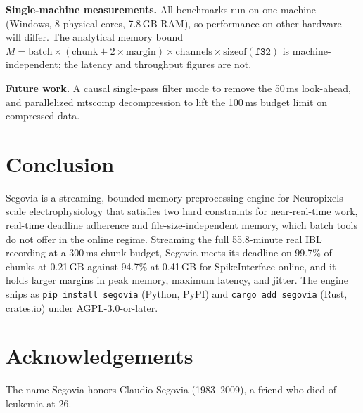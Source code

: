 \documentclass[11pt]{article}
\begin{document}
\textbf{Single-machine measurements.} All benchmarks run on one machine (Windows, 8 physical cores,
7.8\,GB RAM), so performance on other hardware will differ. The analytical memory bound
$M = \text{batch} \times (\text{chunk} + 2 \times \text{margin}) \times \text{channels} \times
\text{sizeof}(\texttt{f32})$ is machine-independent; the latency and throughput figures are not.

\textbf{Future work.} A causal single-pass filter mode to remove the 50\,ms look-ahead, and
parallelized mtscomp decompression to lift the 100\,ms budget limit on compressed data.

\section{Conclusion}

Segovia is a streaming, bounded-memory preprocessing engine for Neuropixels-scale electrophysiology
that satisfies two hard constraints for near-real-time work, real-time deadline adherence and
file-size-independent memory, which batch tools do not offer in the online regime. Streaming the full
55.8-minute real IBL recording at a 300\,ms chunk budget, Segovia meets its deadline on 99.7\% of
chunks at 0.21\,GB against 94.7\% at 0.41\,GB for SpikeInterface online, and it holds larger margins in
peak memory, maximum latency, and jitter. The engine ships as \texttt{pip install segovia} (Python,
PyPI) and \texttt{cargo add segovia} (Rust, crates.io) under AGPL-3.0-or-later.

\section*{Acknowledgements}

The name Segovia honors Claudio Segovia (1983--2009), a friend who died of leukemia at 26.



\end{document}
